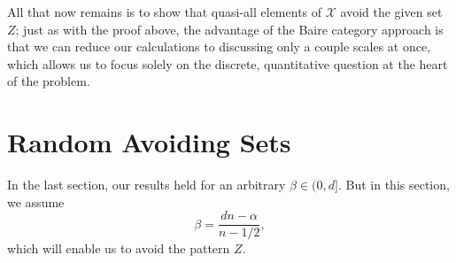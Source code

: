 \documentclass[12pt,reqno]{article}
\numberwithin{equation}{section}
\begin{document}
All that now remains is to show that quasi-all elements of $\mathcal{X}$ avoid the given set $Z$; just as with the proof above, the advantage of the Baire category approach is that we can reduce our calculations to discussing only a couple scales at once, which allows us to focus solely on the discrete, quantitative question at the heart of the problem.

\section{Random Avoiding Sets} 

In the last section, our results held for an arbitrary $\beta \in (0,d]$. But in this section, we assume
%
\[ \beta = \frac{dn - \alpha}{n - 1/2}, \]
%
which will enable us to avoid the pattern $Z$.
\end{document}
